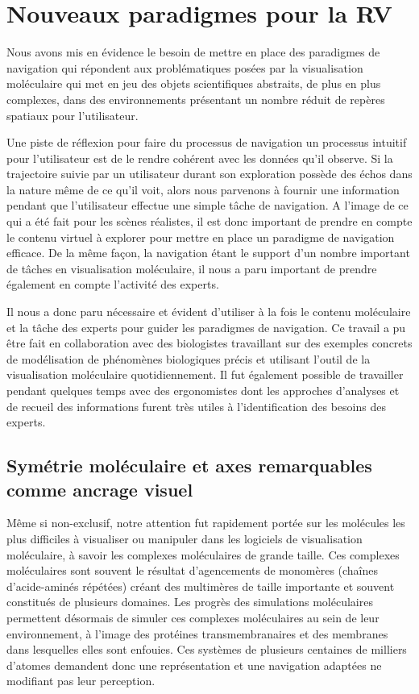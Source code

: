 \section{Nouveaux paradigmes pour la RV}

Nous avons mis en évidence le besoin de mettre en place des paradigmes de navigation qui répondent aux problématiques posées par la visualisation moléculaire qui met en jeu des objets scientifiques abstraits, de plus en plus complexes, dans des environnements présentant un nombre réduit de repères spatiaux pour l'utilisateur.

Une piste de réflexion pour faire du processus de navigation un processus intuitif pour l'utilisateur est de le rendre cohérent avec les données qu'il observe. Si la trajectoire suivie par un utilisateur durant son exploration possède des échos dans la nature même de ce qu'il voit, alors nous parvenons à fournir une information pendant que l'utilisateur effectue une simple tâche de navigation. A l'image de ce qui a été fait pour les scènes réalistes, il est donc important de prendre en compte le contenu virtuel à explorer pour mettre en place un paradigme de navigation efficace. De la même façon, la navigation étant le support d'un nombre important de tâches en visualisation moléculaire, il nous a paru important de prendre également en compte l'activité des experts. 

Il nous a donc paru nécessaire et évident d'utiliser à la fois le contenu moléculaire et la tâche des experts pour guider les paradigmes de navigation. Ce travail a pu être fait en collaboration avec des biologistes travaillant sur des exemples concrets de modélisation de phénomènes biologiques précis et utilisant l'outil de la visualisation moléculaire quotidiennement. Il fut également possible de travailler pendant quelques temps avec des ergonomistes dont les approches d'analyses et de recueil des informations furent très utiles à l'identification des besoins des experts.

\subsection{Symétrie moléculaire et axes remarquables comme ancrage visuel}

Même si non-exclusif, notre attention fut rapidement portée sur les molécules les plus difficiles à visualiser ou manipuler dans les logiciels de visualisation moléculaire, à savoir les complexes moléculaires de grande taille. Ces complexes moléculaires sont souvent le résultat d'agencements de monomères (chaînes d'acide-aminés répétées) créant des multimères de taille importante et souvent constitués de plusieurs domaines. Les progrès des simulations moléculaires permettent désormais de simuler ces complexes moléculaires au sein de leur environnement, à l'image des protéines transmembranaires et des membranes dans lesquelles elles sont enfouies. Ces systèmes de plusieurs centaines de milliers d'atomes demandent donc une représentation et une navigation adaptées ne modifiant pas leur perception.

